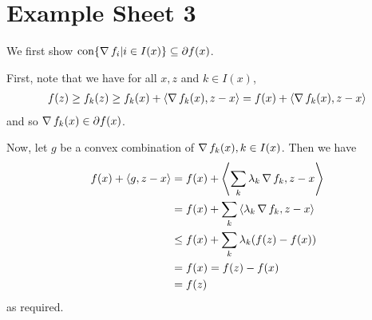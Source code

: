 
\chapter{Example Sheet 3}
\label{cha:example-sheet-3}

\begin{exercises}
\item
\item
  We first show $\operatorname*{con} \{ \operatorname*{\nabla} f_{i} | i \in I(x) \}
  \subseteq \partial f(x)$.

  First, note that we have for all $x, z$ and $k \in I(x)$,
  \begin{align}
    \label{eq:41}
    f(z) \geq f_{k}(z) \geq f_{k}(x) + \IP{\grad f_{k}(x), z -x} =
    f(x) + \IP{\grad f_{k}(x), z-x}
  \end{align} 
  and so $\operatorname*{\nabla} f_{k}(x) \in \partial f(x)$. 

  Now, let $g$ be a convex combination of $\operatorname*{\nabla} f_{k}(x), k \in
  I(x)$.  Then we have
  \begin{align}
    \label{eq:42}
    f(x) + \IP{g, z-x} &= f(x) + \IP{\sum_{k} \lambda_{k} \grad f_{k},
      z-x} \\
    &= f(x) + \sum_{k} \IP{\lambda_{k} \grad f_{k}, z - x} \\
    &\leq f(x) + \sum_{k} \lambda_{k} (f(z) - f(x)) \\
    &= f(x) = f(z) - f(x) \\
    &= f(z)
  \end{align} as required.


\end{exercises}

